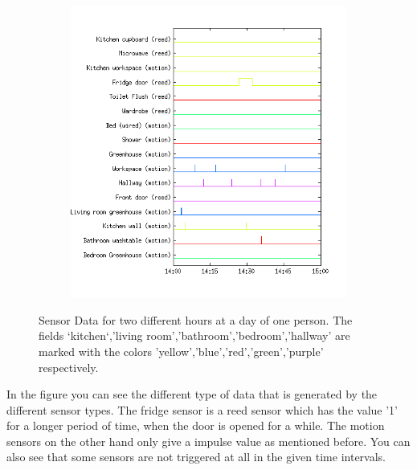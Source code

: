 \documentclass[a4paper,fleqn]{article}
\begin{document}
\begin{figure}[h!]
\begin{subfigure}[b]{0.45\textwidth}
    \includegraphics[width=\textwidth]{Pictures/SensorsNoonHN3Day34.png}
  \end{subfigure}
  \caption{Sensor Data for two different hours at a day of one person. The fields `kitchen`,'living room','bathroom','bedroom','hallway' are marked with the colors 'yellow','blue','red','green','purple' respectively.}
  \label{fig:PlaineSensorData}
\end{figure}

In the figure you can see the different type of data that is generated by the different sensor types. The fridge sensor is a reed sensor which has the value '1' for a longer period of time, when the door is opened for a while. The motion sensors on the other hand only give a impulse value as mentioned before. You can also see that some sensors are not triggered at all in the given time intervals.


\pagebreak

\end{document}
